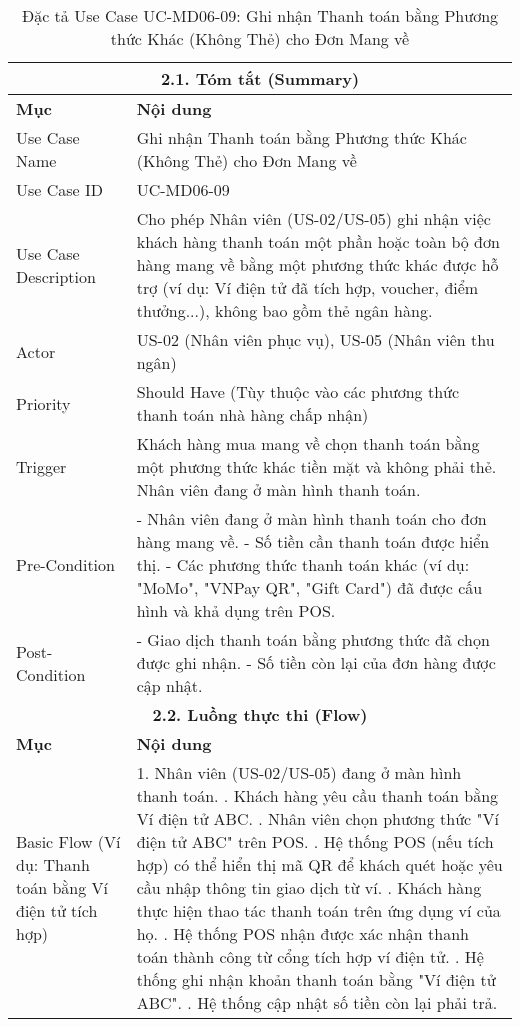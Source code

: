 \begin{longtable}{|m{4cm}|p{11cm}|}
\caption{Đặc tả Use Case UC-MD06-09: Ghi nhận Thanh toán bằng Phương thức Khác (Không Thẻ) cho Đơn Mang về} \label{tab:uc_md06_09_final_v3} \\
\hline
\multicolumn{2}{|c|}{\textbf{2.1. Tóm tắt (Summary)}} \\
\hline
\textbf{Mục} & \textbf{Nội dung} \\
\hline
\endhead %
\hline
\endfoot %
\hline
\endlastfoot %
Use Case Name & Ghi nhận Thanh toán bằng Phương thức Khác (Không Thẻ) cho Đơn Mang về \\
\hline
Use Case ID & UC-MD06-09 \\
\hline
Use Case Description & Cho phép Nhân viên (US-02/US-05) ghi nhận việc khách hàng thanh toán một phần hoặc toàn bộ đơn hàng mang về bằng một phương thức khác được hỗ trợ (ví dụ: Ví điện tử đã tích hợp, voucher, điểm thưởng...), không bao gồm thẻ ngân hàng. \\
\hline
Actor & US-02 (Nhân viên phục vụ), US-05 (Nhân viên thu ngân) \\
\hline
Priority & Should Have (Tùy thuộc vào các phương thức thanh toán nhà hàng chấp nhận) \\
\hline
Trigger & Khách hàng mua mang về chọn thanh toán bằng một phương thức khác tiền mặt và không phải thẻ. Nhân viên đang ở màn hình thanh toán. \\
\hline
Pre-Condition & - Nhân viên đang ở màn hình thanh toán cho đơn hàng mang về. \newline - Số tiền cần thanh toán được hiển thị. \newline - Các phương thức thanh toán khác (ví dụ: "MoMo", "VNPay QR", "Gift Card") đã được cấu hình và khả dụng trên POS. \\
\hline
Post-Condition & - Giao dịch thanh toán bằng phương thức đã chọn được ghi nhận. \newline - Số tiền còn lại của đơn hàng được cập nhật. \\
\hline
\multicolumn{2}{|c|}{\textbf{2.2. Luồng thực thi (Flow)}} \\
\hline
\textbf{Mục} & \textbf{Nội dung} \\
\hline
Basic Flow (Ví dụ: Thanh toán bằng Ví điện tử tích hợp) & 1. Nhân viên (US-02/US-05) đang ở màn hình thanh toán. \newline 2. Khách hàng yêu cầu thanh toán bằng Ví điện tử ABC. \newline 3. Nhân viên chọn phương thức "Ví điện tử ABC" trên POS. \newline 4. Hệ thống POS (nếu tích hợp) có thể hiển thị mã QR để khách quét hoặc yêu cầu nhập thông tin giao dịch từ ví. \newline 5. Khách hàng thực hiện thao tác thanh toán trên ứng dụng ví của họ. \newline 6. Hệ thống POS nhận được xác nhận thanh toán thành công từ cổng tích hợp ví điện tử. \newline 7. Hệ thống ghi nhận khoản thanh toán bằng "Ví điện tử ABC". \newline 8. Hệ thống cập nhật số tiền còn lại phải trả. \\

\end{longtable}

